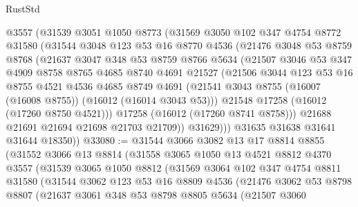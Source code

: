 \begin{lexlean}{RustStd}
\begin{coremodule}
        @3557
        (@31539
          @3051
          @1050
          @8773
          (@31569
            @3050
            @102
            @347
            @4754
            @8772
            @31580
            (@31544
              @3048
              @123
              @53
              @16
              @8770
              @4536
              (@21476
                @3048
                @53
                @8759
                @8768
                (@21637
                  @3047
                  @348
                  @53
                  @8759
                  @8766
                  @5634
                  (@21507
                    @3046
                    @53
                    @347
                    @4909
                    @8758
                    @8765
                    @4685
                    @8740
                    @4691
                    @21527
                    (@21506
                      @3044
                      @123
                      @53
                      @16
                      @8755
                      @4521
                      @4536
                      @4685
                      @8749
                      @4691
                      (@21541 @3043 @8755 (@16007 (@16008 @8755)) (@16012 (@16014 @3043 @53)))
                      @21548
                      @17258
                      (@16012 (@17260 @8750 @4521)))
                    @17258
                    (@16012 (@17260 @8741 @8758)))
                  @21688
                  @21691
                  @21694
                  @21698
                  @21703
                  @21709))
              @31629)))
        @31635
        @31638
        @31641
        @31644
        @18350))
@33080 := @31544
    @3066
    @3082
    @13
    @17
    @8814
    @8855
    (@31552
      @3066
      @13
      @8814
      (@31558
        @3065
        @1050
        @13
        @4521
        @8812
        @4370
        @3557
        (@31539
          @3065
          @1050
          @8812
          (@31569
            @3064
            @102
            @347
            @4754
            @8811
            @31580
            (@31544
              @3062
              @123
              @53
              @16
              @8809
              @4536
              (@21476
                @3062
                @53
                @8798
                @8807
                (@21637
                  @3061
                  @348
                  @53
                  @8798
                  @8805
                  @5634
                  (@21507
                    @3060

\end{coremodule}
\end{lexlean}
